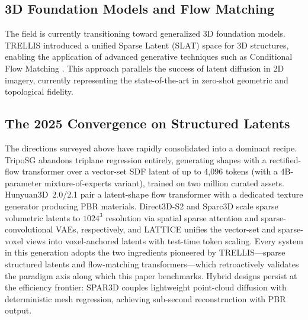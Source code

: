\documentclass[10pt, conference]{IEEEtran}
\begin{document}
\subsection{3D Foundation Models and Flow Matching}
The field is currently transitioning toward generalized 3D foundation models. TRELLIS \cite{trellis2024} introduced a unified Sparse Latent (SLAT) space for 3D structures, enabling the application of advanced generative techniques such as Conditional Flow Matching \cite{rectifiedflow}. This approach parallels the success of latent diffusion in 2D imagery, currently representing the state-of-the-art in zero-shot geometric and topological fidelity.

\subsection{The 2025 Convergence on Structured Latents}
The directions surveyed above have rapidly consolidated into a dominant recipe. TripoSG \cite{triposg2025} abandons triplane regression entirely, generating shapes with a rectified-flow transformer over a vector-set SDF latent of up to 4{,}096 tokens (with a 4B-parameter mixture-of-experts variant), trained on two million curated assets. Hunyuan3D~2.0/2.1 \cite{hunyuan3d2_2025,hunyuan3d21_2025} pair a latent-shape flow transformer with a dedicated texture generator producing PBR materials. Direct3D-S2 \cite{direct3ds2_2025} and Sparc3D \cite{sparc3d2025} scale sparse volumetric latents to $1024^3$ resolution via spatial sparse attention and sparse-convolutional VAEs, respectively, and LATTICE \cite{lattice2025} unifies the vector-set and sparse-voxel views into voxel-anchored latents with test-time token scaling. Every system in this generation adopts the two ingredients pioneered by TRELLIS---sparse structured latents and flow-matching transformers---which retroactively validates the paradigm axis along which this paper benchmarks. Hybrid designs persist at the efficiency frontier: SPAR3D \cite{spar3d2025} couples lightweight point-cloud diffusion with deterministic mesh regression, achieving sub-second reconstruction with PBR output.
\end{document}
